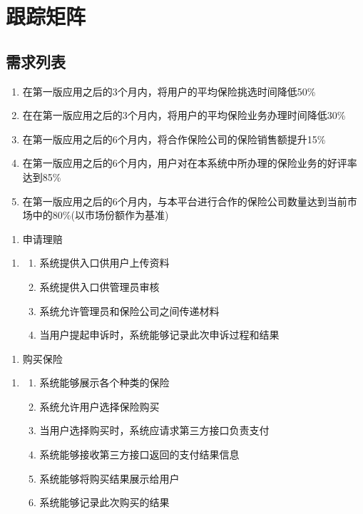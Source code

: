 \documentclass[a4paper]{ctexart}
\begin{document}
\section{跟踪矩阵}

\subsection{需求列表}
\begin{enumerate}[label=BR\arabic*.]
  \item 在第一版应用之后的3个月内，将用户的平均保险挑选时间降低50\%
  \item 在在第一版应用之后的3个月内，将用户的平均保险业务办理时间降低30\%
  \item 在第一版应用之后的6个月内，将合作保险公司的保险销售额提升15\%
  \item 在第一版应用之后的6个月内，用户对在本系统中所办理的保险业务的好评率达到85\%
  \item 在第一版应用之后的6个月内，与本平台进行合作的保险公司数量达到当前市场中的80\%(以市场份额作为基准)
\end{enumerate}

\begin{enumerate}[label=UR1.]
  \item 申请理赔
\end{enumerate}
\begin{enumerate}[label=SR1.]
  \item 
  \begin{enumerate}[label=\arabic*).]
    \item 系统提供入口供用户上传资料
    \item 系统提供入口供管理员审核
    \item 系统允许管理员和保险公司之间传递材料
    \item 当用户提起申诉时，系统能够记录此次申诉过程和结果
  \end{enumerate}
\end{enumerate}

\begin{enumerate}[label=UR2.]
  \item 购买保险
\end{enumerate}
\begin{enumerate}[label=SR2.]
  \item 
  \begin{enumerate}[label=\arabic*).]
    \item 系统能够展示各个种类的保险
    \item 系统允许用户选择保险购买
    \item 当用户选择购买时，系统应请求第三方接口负责支付
    \item 系统能够接收第三方接口返回的支付结果信息
    \item 系统能够将购买结果展示给用户
    \item 系统能够记录此次购买的结果
  \end{enumerate}
\end{enumerate}
\end{document}
